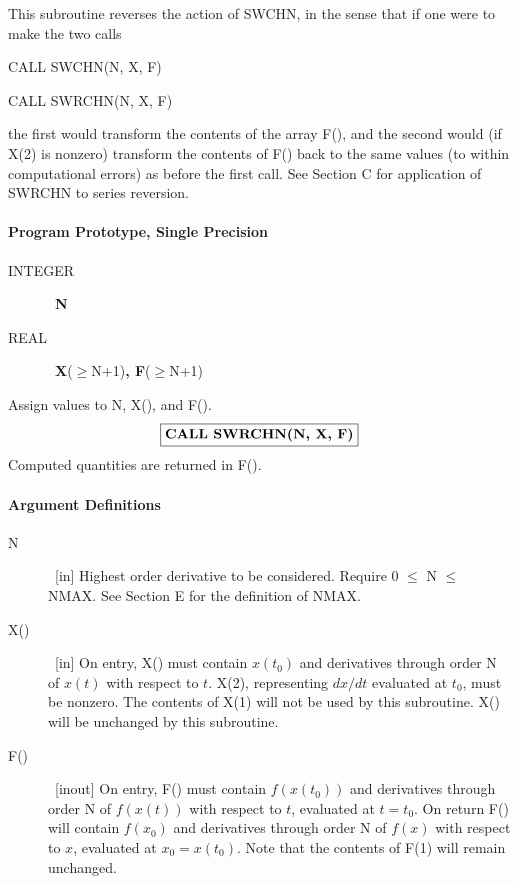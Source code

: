 \documentclass[twoside]{MATH77}
\begin{document}
This subroutine reverses the action of SWCHN, in the sense that if one were
to make the two calls

CALL SWCHN(N, X, F)

CALL SWRCHN(N, X, F)

the first would transform the contents of the array F(), and the second
would (if X(2) is nonzero) transform the contents of F() back to the same
values (to within computational errors) as before the first call. See
Section C for application of SWRCHN to series reversion.

\paragraph{Program Prototype, Single Precision}

\begin{description}
\item[INTEGER]  \ {\bf N}

\item[REAL]  \ {\bf X}($\geq $N+1){\bf , F}($\geq $N+1)
\end{description}

Assign values to N, X(), and F().
$$
\fbox{{\bf CALL SWRCHN(N, X, F)}}
$$
Computed quantities are returned in F().

\paragraph{Argument Definitions}

\begin{description}
\item[N]  \ [in] Highest order derivative to be considered. Require 0 $\leq $
N $\leq $ NMAX. See Section E for the definition of NMAX.

\item[X()]  \ [in] On entry, X() must contain $x(t_0)$ and derivatives
through order N of $x(t)$ with respect to $t$. X(2), representing $dx/dt$
evaluated at $t_0$, must be nonzero. The contents of X(1) will not be used
by this subroutine. X() will be unchanged by this subroutine.

\item[F()]  \ [inout] On entry, F() must contain $f(x(t_0))$ and derivatives
through order N of $f(x(t))$ with respect to $t$, evaluated at $t=t_0$. On
return F() will contain $f(x_0)$ and derivatives through order N of $f(x)$
with respect to $x$, evaluated at $x_0=x(t_0)$. Note that the contents of
F(1) will remain unchanged.
\end{description}
\end{document}
